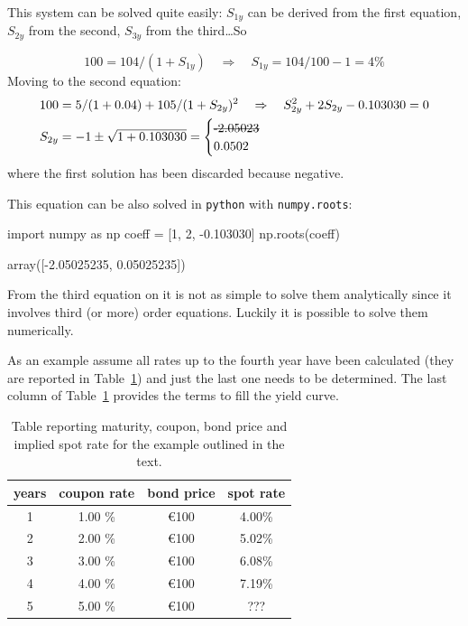 This system can be solved quite easily: $S_{1y}$ can be derived from the first equation, $S_{2y}$ from the second, $S_{3y}$ from the third\ldots So

\begin{equation}
100 = 104 / (1 + S_{1y})\quad\Rightarrow\quad S_{1y} = 104/100 - 1 = 4\%
\end{equation}
Moving to the second equation:
\begin{equation}
\begin{split}
& 100 = 5 / (1 + 0.04) + 105 / (1 + S_{2y})^{2}\quad\Rightarrow\quad S_{2y}^2  + 2 S_{2y}  - 0.103030 = 0 \\
& S_{2y} = - 1 \pm \sqrt{1 + 0.103030} = \begin{cases}\text{\sout{-2.05023}} \\ 0.0502\end{cases}
\end{split}
\end{equation}
where the first solution has been discarded because negative.

This equation can be also solved in \texttt{python} with \texttt{numpy.roots}:
\begin{ipython}
import numpy as np
coeff = [1, 2, -0.103030]
np.roots(coeff)
\end{ipython}
\begin{ioutput}
array([-2.05025235,  0.05025235])
\end{ioutput}

From the third equation on it is not as simple to solve them analytically since it involves third (or more) order equations. Luckily it is possible to solve them numerically.

As an example assume all rates up to the fourth year have been calculated (they are reported in Table~\ref{tab:rates}) and just the last one needs to be determined. The last column of Table~\ref{tab:rates} provides the terms to fill the yield curve.

\begin{table}[htb]
\begin{center}
\begin{tabular}{|c|c|c|c|}
\hline
\textbf{years} & \textbf{coupon rate} & \textbf{bond price} & \textbf{spot rate} \\
\hline
1 & 1.00 \% & \euro{100} & 4.00\% \\
\hline
2 & 2.00 \% & \euro{100} & 5.02\% \\
\hline
3 & 3.00 \% & \euro{100} & 6.08\% \\
\hline
4 & 4.00 \% & \euro{100} & 7.19\% \\
\hline
5 & 5.00 \% & \euro{100} & ??? \\
\hline
\end{tabular}
\end{center}
\caption{Table reporting maturity, coupon, bond price and implied spot rate for the example outlined in the text.}
\label{tab:rates}
\end{table}

